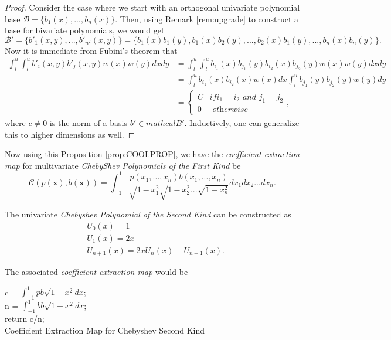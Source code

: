 \documentclass[12pt]{amsart}
\numberwithin{equation}{section}
\theoremstyle{definition}
\numberwithin{thm}{section}
\begin{document}
\begin{proof}
     Consider the case where we start with an orthogonal univariate polynomial base $\mathcal{B} = \{b_1(x), ..., b_n(x)\}$. 
     Then, using Remark \ref{rem:upgrade} to construct a base for bivariate polynomials, we would get 
     \begin{equation*}
          \mathcal{B}' =  \{b'_1(x, y), ..., b'_{n^2}(x, y)\} = \{b_1(x)b_1(y), b_1(x)b_2(y), ..., b_2(x)b_1(y), ..., b_n(x)b_n(y)\}.
     \end{equation*}
     Now it is immediate from Fubini's theorem that
     \begin{align*}
          \int_l^u \int_l^u  b'_i(x, y)b'_j(x, y)w(x)w(y) dx dy  & = \int_l^u \int_l^u  b_{i_1}(x) b_{j_1}(y) b_{i_2}(x)b_{j_2}(y) w(x)w(y) dx dy \\
               & = \int_l^u  b_{i_1}(x) b_{i_2}(x) w(x) dx  \int_l^u b_{j_1}(y) b_{j_2}(y) w(y) dy \\
               & = \begin{cases}
                    C & if i_1 = i_2 \textit{ and } j_1 = j_2\\
                    0 & \textit{ otherwise }
              \end{cases},
     \end{align*}
     where $c \neq 0$ is the norm of a basis $b' \in mathcal{B}'$.
     Inductively, one can generalize this to higher dimensions as well.
\end{proof}

Now using this Proposition \ref{prop:COOLPROP}, we have the \emph{coefficient extraction map} for multivariate \emph{ChebyShev Polynomials of the First Kind} be
\begin{equation*}
     \mathcal{C}(p(\mathbf{x}), b(\mathbf{x})) = \int_{-1}^1 \frac{p(x_1, ..., x_n)b(x_1, ..., x_n)}{\sqrt{1-x_1^2} \sqrt{1-x_2^2} ... \sqrt{1-x_n^2}} dx_1dx_2 ... dx_n.
\end{equation*} 

The univariate \emph{Chebyshev Polynomial of the Second Kind} can be constructed as
\begin{align*} 
     &U_0(x) = 1 \\ 
     &U_1(x) = 2x \\
     &U_{n+1}(x) = 2x U_n(x) - U_{n-1}(x).
\end{align*}

The associated \emph{coefficient extraction map} would be

\begin{algorithm}[H]
     \SetAlgoLined
     c = $\int_{-1}^1 pb\sqrt{1-x^2} dx$;\\
     n = $\int_{-1}^1 bb\sqrt{1-x^2} dx$;\\
     return c/n;\\
     \caption{Coefficient Extraction Map for Chebyshev Second Kind}
\end{algorithm}
\end{document}
